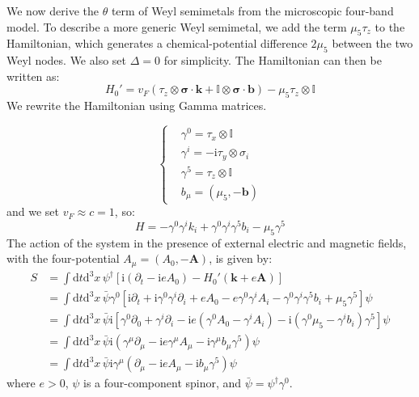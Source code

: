 We now derive the $\theta$ term of Weyl semimetals from the microscopic four-band model. To describe a more generic Weyl semimetal, we add the term $\mu_5 \tau_z$ to the Hamiltonian, which generates a chemical-potential difference $2\mu_5$ between the two Weyl nodes. We also set $\Delta=0$ for simplicity. The Hamiltonian can then be written as:
\begin{equation}
H_0' = v_F (\tau_z \otimes \bm{\sigma} \cdot \bm{k} + \mathbb{I} \otimes \bm{\sigma} \cdot \bm{b}) - \mu_5 \tau_z \otimes \mathbb{I}
\end{equation}
We rewrite the Hamiltonian using Gamma matrices.

\begin{equation}
\left\{
\begin{aligned}
& \gamma^0 = \tau_x \otimes \mathbb{I} \\
& \gamma^i = -\mathrm{i} \tau_y \otimes \sigma_i \\
& \gamma^5 = \tau_z \otimes \mathbb{I} \\
& b_\mu = (\mu_5, -\bm{b})
\end{aligned}
\right.
\end{equation}
and we set $v_F \approx c = 1$, so:
\begin{equation}
H = - \gamma^0 \gamma^i k_i + \gamma^0 \gamma^i \gamma^5 b_i - \mu_5 \gamma^5
\end{equation}
The action of the system in the presence of external electric and magnetic fields, with the four-potential $A_\mu = (A_0, -\bm{A})$, is given by:
\begin{equation}
\begin{aligned}
S &= \int \mathrm{d}t \mathrm{d}^3x \, \psi^\dagger [\mathrm{i}(\partial_t - \mathrm{i} e A_0) - H_0'(\bm{k}+e\bm{A})] \\
&= \int \mathrm{d}t \mathrm{d}^3x \, \bar{\psi} \gamma^0 [\mathrm{i} \partial_t + \mathrm{i} \gamma^0 \gamma^i \partial_i + e A_0 - e \gamma^0 \gamma^i A_i - \gamma^0 \gamma^i \gamma^5 b_i + \mu_5 \gamma^5] \psi \\
&= \int \mathrm{d}t \mathrm{d}^3x \, \bar{\psi} \mathrm{i} [\gamma^0 \partial_0 + \gamma^i \partial_i - \mathrm{i} e (\gamma^0 A_0 - \gamma^i A_i) - \mathrm{i} (\gamma^0 \mu_5 - \gamma^i b_i) \gamma^5] \psi \\
&= \int \mathrm{d}t \mathrm{d}^3x \, \bar{\psi} \mathrm{i} (\gamma^\mu \partial_\mu - \mathrm{i} e \gamma^\mu A_\mu - \mathrm{i} \gamma^\mu b_\mu \gamma^5) \psi \\
&= \int \mathrm{d}t \mathrm{d}^3x \, \bar{\psi} \mathrm{i} \gamma^\mu (\partial_\mu - \mathrm{i} e A_\mu - \mathrm{i} b_\mu \gamma^5) \psi
\end{aligned}
\end{equation}
where $e>0$, $\psi$ is a four-component spinor, and $\bar{\psi} = \psi^\dagger \gamma^0$.

